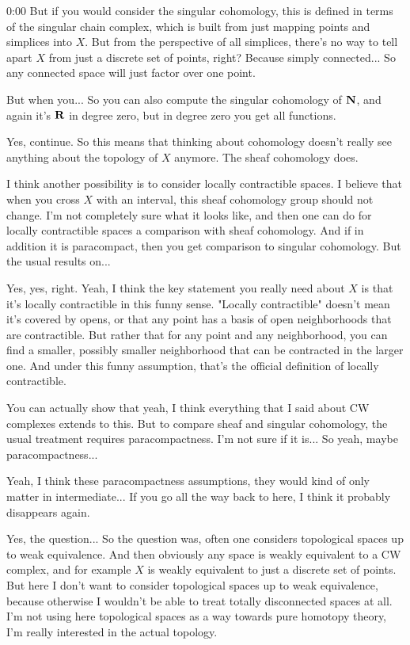 \begin{unfinished}{0:00}
But if you would consider the singular cohomology, this is defined in terms of the singular chain complex, which is built from just mapping points and simplices into $X$. But from the perspective of all simplices, there's no way to tell apart $X$ from just a discrete set of points, right? Because simply connected... So any connected space will just factor over one point.

But when you... So you can also compute the singular cohomology of $\mathbf N$, and again it's $\mathbf R$ in degree zero, but in degree zero you get all functions.

Yes, continue. So this means that thinking about cohomology doesn't really see anything about the topology of $X$ anymore. The sheaf cohomology does.

I think another possibility is to consider locally contractible spaces. I believe that when you cross $X$ with an interval, this sheaf cohomology group should not change. I'm not completely sure what it looks like, and then one can do for locally contractible spaces a comparison with sheaf cohomology. And if in addition it is paracompact, then you get comparison to singular cohomology. But the usual results on... 

Yes, yes, right. Yeah, I think the key statement you really need about $X$ is that it's locally contractible in this funny sense. "Locally contractible" doesn't mean it's covered by opens, or that any point has a basis of open neighborhoods that are contractible. But rather that for any point and any neighborhood, you can find a smaller, possibly smaller neighborhood that can be contracted in the larger one. And under this funny assumption, that's the official definition of locally contractible.

You can actually show that yeah, I think everything that I said about CW complexes extends to this. But to compare sheaf and singular cohomology, the usual treatment requires paracompactness. I'm not sure if it is... So yeah, maybe paracompactness... 

Yeah, I think these paracompactness assumptions, they would kind of only matter in intermediate... If you go all the way back to here, I think it probably disappears again.

Yes, the question... So the question was, often one considers topological spaces up to weak equivalence. And then obviously any space is weakly equivalent to a CW complex, and for example $X$ is weakly equivalent to just a discrete set of points. But here I don't want to consider topological spaces up to weak equivalence, because otherwise I wouldn't be able to treat totally disconnected spaces at all. I'm not using here topological spaces as a way towards pure homotopy theory, I'm really interested in the actual topology.


\end{unfinished}
